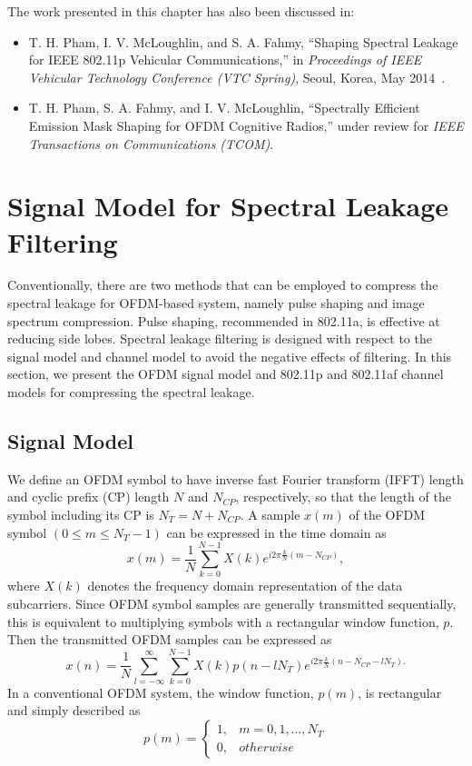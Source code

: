 The work presented in this chapter has also been discussed in:
\begin{itemize}
\item  T. H. Pham, I. V. McLoughlin, and S. A. Fahmy, ``Shaping Spectral Leakage for IEEE 802.11p Vehicular Communications,'' in \textit{Proceedings of IEEE Vehicular Technology Conference (VTC Spring)}, Seoul, Korea, May 2014~\cite{PhamMay2014}.
\item T. H. Pham, S. A. Fahmy, and I. V. McLoughlin, ``Spectrally Efficient Emission Mask Shaping for OFDM Cognitive Radios,''  under review for \textit{IEEE Transactions on Communications (TCOM)}.
\end{itemize}

\section{Signal Model for Spectral Leakage Filtering}
\label{sec:SigMod}
Conventionally, there are two methods that can be employed to compress the spectral leakage for OFDM-based system, namely pulse shaping and image spectrum compression. Pulse shaping, recommended in 802.11a, is effective at reducing side lobes. Spectral leakage filtering is designed with respect to the signal model and channel model to avoid the negative effects of filtering. In this section, we present the OFDM signal model and 802.11p and 802.11af channel models for compressing the spectral leakage.

\subsection{Signal Model}
We define an OFDM symbol to have inverse fast Fourier transform (IFFT) length and cyclic prefix (CP) length $N$ and $N_{CP}$, respectively, so that the length of the symbol including its CP is $N_{T} = N + N_{CP}$.
A sample $x(m)$ of the OFDM symbol $(0\leq m \leq N_{T}-1)$ can be expressed in the time domain as
\begin{equation}
\label{xm}
x(m) = \frac{1}{N}\sum_{k=0}^{N-1} X(k) e^{i2\pi\frac{k}{N}(m-N_{CP})},
\end{equation}
where $X(k)$ denotes the frequency domain representation of the data subcarriers.
Since OFDM symbol samples are generally transmitted sequentially, this is equivalent to multiplying symbols with a rectangular window function, $p$.
Then the transmitted OFDM samples can be expressed as
\begin{equation}
\label{xn2}
x(n) = \frac{1}{N}\sum_{l=-\infty}^{\infty} \sum_{k=0}^{N-1} X(k) p(n-l N_{T}) e^{i2\pi\frac{k}{N}(n-N_{CP}-l N_{T}).}
\end{equation}
In a conventional OFDM system, the window function, $p(m)$, is rectangular and simply described as
\begin{equation}
\label{pm}
 p(m) =\begin{cases}1, & m = 0,1, ..., N_{T} \\  0, & otherwise \end{cases}
\end{equation}

